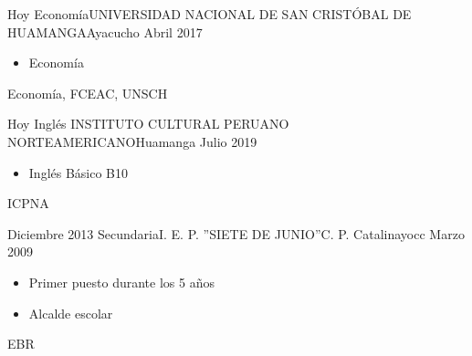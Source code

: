 \begin{experiences}

  \experience
  {Hoy}    {Economía}{UNIVERSIDAD NACIONAL DE SAN CRISTÓBAL DE HUAMANGA}{Ayacucho}
  {Abril 2017}   {
    \begin{itemize}
      \item Economía
    \end{itemize}
  }
  {Economía, FCEAC, UNSCH}
  \emptySeparator

  \experience
  {Hoy}    {Inglés}{ INSTITUTO CULTURAL PERUANO NORTEAMERICANO}{Huamanga}
  {Julio 2019}   {
    \begin{itemize}
      \item  Inglés Básico B10
    \end{itemize}
  }
  {ICPNA}
  \emptySeparator

  \experience
  {Diciembre 2013}    {Secundaria}{I. E. P. ”SIETE DE JUNIO”}{C. P. Catalinayocc}
  {Marzo 2009}   {
    \begin{itemize}
      \item Primer puesto durante los 5 años
      \item Alcalde escolar
    \end{itemize}
  }
  {EBR}

\end{experiences}




